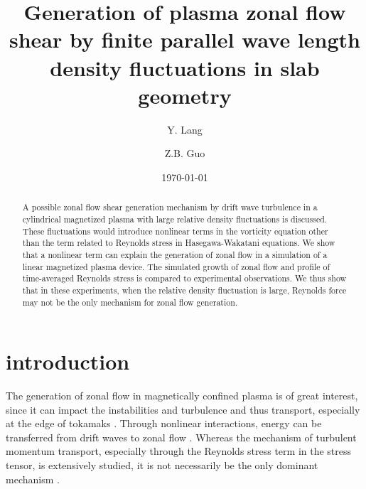 \documentclass[aps,pre,twocolumn,superscriptaddress]{revtex4-1}
\begin{document}
\title{
Generation of plasma zonal flow shear by finite parallel wave length density fluctuations in slab geometry
}


\author{Y. Lang}
\author{Z.B. Guo}

\date{\today}


\begin{abstract}
A possible zonal flow shear generation mechanism by drift wave turbulence in a cylindrical magnetized plasma with large relative density fluctuations is discussed. These fluctuations would introduce nonlinear terms in the vorticity equation other than the term related to Reynolds stress in Hasegawa-Wakatani equations. We show that a nonlinear term can explain the generation of zonal flow in a simulation of a linear magnetized plasma device. The simulated growth of zonal flow and profile of time-averaged Reynolds stress is compared to experimental observations. We thus show that in these experiments, when the relative density fluctuation is large, Reynolds force may not be the only mechanism for zonal flow generation.
\end{abstract}
\maketitle


\section{\label{sec:introduction}introduction}
The generation of zonal flow in magnetically confined plasma is of great interest, since it can impact the instabilities and turbulence and thus transport, especially at the edge of tokamaks \cite{Li_2020}. Through nonlinear interactions, energy can be transferred from drift waves to zonal flow \cite{Diamond_2005}. Whereas the mechanism of turbulent momentum transport, especially through the Reynolds stress term in the stress tensor, is extensively studied, it is not necessarily be the only dominant mechanism \cite{Diamond_2009, Diamond_2013}.
\end{document}
